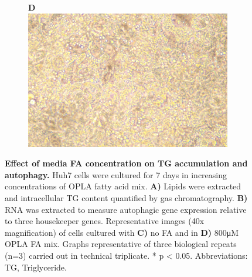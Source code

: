 \begin{figure}[h!]
\begin{subfigure}[b]{0.49\textwidth}
     \end{subfigure}
     \hfill
      \begin{subfigure}[b]{0.49\textwidth}
         \textbf{D}
         \centering
         \includegraphics[width=\textwidth]{figures/ch3-Model Development/OPLA 800uM Picture.png}
     \end{subfigure}
     \hfill
        \caption{\textbf{Effect of media FA concentration on TG accumulation and autophagy.} Huh7 cells were cultured for 7 days in increasing concentrations of OPLA fatty acid mix. \textbf{A)} Lipids were extracted and intracellular TG content quantified by gas chromatography. \textbf{B)} RNA was extracted to measure autophagic gene expression relative to three housekeeper genes. Representative images (40x magnification) of cells cultured with \textbf{C)} no FA and in \textbf{D)} 800μM OPLA FA mix. Graphs representative of three biological repeats (n=3) carried out in technical triplicate. * p < 0.05. Abbreviations: TG, Triglyceride.}
        \label{fig:ch3-Model Development LFHF}
\end{figure}

